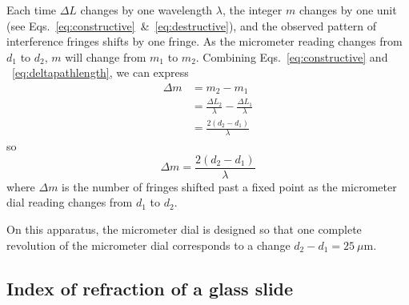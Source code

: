 \documentclass{tufte-handout}
\begin{document}
Each time $\Delta L$ changes by one wavelength $\lambda$, the integer $m$ changes
by one unit (see Eqs.~\ref{eq:constructive}~\&~\ref{eq:destructive}), and the
observed pattern of interference fringes shifts by one fringe. As the micrometer
reading changes from $d_{1}$ to $d_{2}$, $m$ will change from $m_{1}$ to
$m_{2}$. Combining Eqs.~\ref{eq:constructive} and ~\ref{eq:deltapathlength}, we
can express 
\begin{align}
 \Delta m &= m_2 - m_1 \nonumber \\
 &= \frac{\Delta L_{2}}{\lambda} - \frac{\Delta L_{1}}{\lambda} \nonumber \\
 &= \frac{2(d_{2} - d_{1})} {\lambda} \nonumber
\end{align}
so
\begin{equation}
\boxed{\Delta m = \frac{2(d_{2} - d_{1})} {\lambda}}
\label{eq:delta-m}
\end{equation}
where $\Delta m$ is the number of fringes shifted past a fixed point as the
micrometer dial reading changes from $d_{1}$ to $d_{2}$. 

On this apparatus, the micrometer dial is designed so that one 
complete revolution of the micrometer dial corresponds to a change 
$d_{2} - d_{1} = 25~\mu$m.

%



\subsection{Index of refraction of a glass slide}
\end{document}
